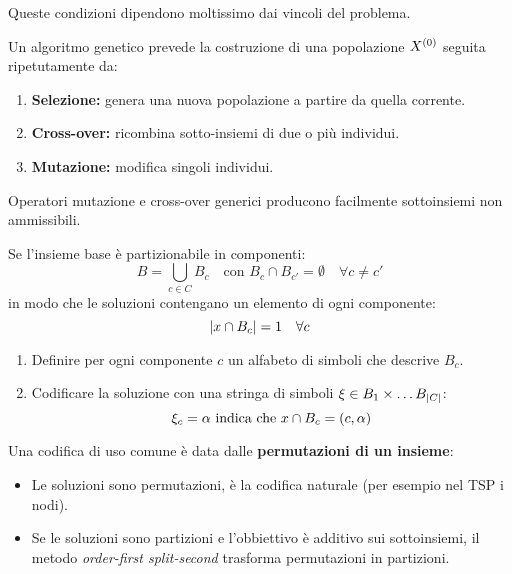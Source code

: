 \documentclass[\main/main.tex]{subfiles}
\begin{document}
\begin{multicols}{2}
\begin{observation}
    Queste condizioni dipendono moltissimo dai vincoli del problema.
\end{observation}
\begin{definition}
    Un algoritmo genetico prevede la costruzione di una popolazione \(X^{\left(0\right)}\) seguita ripetutamente da:
    \begin{enumerate}
        \item \textbf{Selezione:} genera una nuova popolazione a partire da quella corrente.
        \item \textbf{Cross-over:} ricombina sotto-insiemi di due o più individui.
        \item \textbf{Mutazione:} modifica singoli individui.
    \end{enumerate}
\end{definition}
\begin{observation}
    Operatori mutazione e cross-over generici producono facilmente sottoinsiemi non ammissibili.
\end{observation}
\begin{example}
    Se l'insieme base è partizionabile in componenti:
    \[
        B = \bigcup_{c \in C} B_c \quad\text{con } B_c \cap B_{c'} = \emptyset \quad \forall c \neq c' 
    \]
    in modo che le soluzioni contengano un elemento di ogni componente:
    \[
        \left\lvert x \cap B_c\right\rvert = 1 \quad \forall c
    \]
    \begin{enumerate}
        \item Definire per ogni componente \(c\) un alfabeto di simboli che descrive \(B_c\).
        \item Codificare la soluzione con una stringa di simboli \(\xi \in B_1 \times \ldots B_{\left\lvert C\right\rvert}\):
        \[
            \xi_c = \alpha \text{ indica che } x \cap B_c = \left(c, \alpha\right)
        \]
    \end{enumerate}
\end{example}
\begin{definition}
    Una codifica di uso comune è data dalle \textbf{permutazioni di un insieme}:
    \begin{itemize}
        \item Le soluzioni sono permutazioni, è la codifica naturale (per esempio nel TSP i nodi).
        \item Se le soluzioni sono partizioni e l'obbiettivo è additivo sui sottoinsiemi, il metodo \textit{order-first split-second} trasforma permutazioni in partizioni.

\end{itemize}
\end{definition}
\end{multicols}
\end{document}
